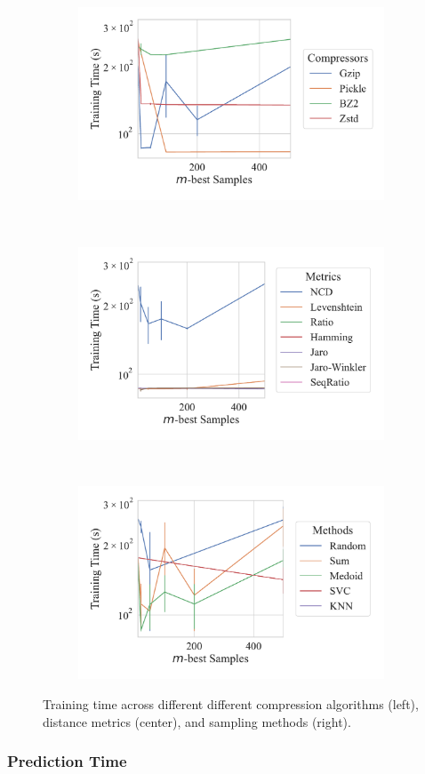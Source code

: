 \documentclass[sigconf]{acmart}
\begin{document}
\begin{figure}
	\begin{subfigure}
		\centering
		\includegraphics[width=.32\textwidth]{figs/truthseeker/compressor_vs_train_time.pdf}
	\end{subfigure}%
	~
	\begin{subfigure}
		\centering
		\includegraphics[width=.32\textwidth]{figs/truthseeker/metric_vs_train_time.pdf}
	\end{subfigure}
	~
	\begin{subfigure}
		\centering
		\includegraphics[width=.32\textwidth]{figs/truthseeker/method_vs_train_time.pdf}
	\end{subfigure}
	\caption{Training time across different different compression algorithms (left), distance metrics (center), and sampling methods (right).}
	\label{fig:training_time}
\end{figure}

\subsubsection{Prediction Time}
\end{document}

